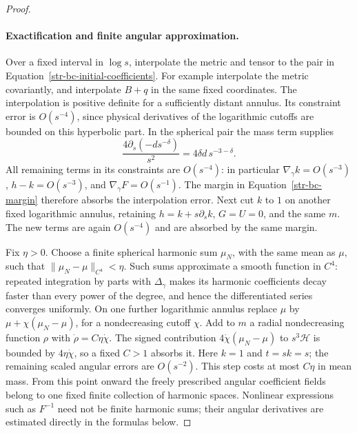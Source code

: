 \begin{proof}
\paragraph{Exactification and finite angular approximation.}
Over a fixed interval in $\log s$, interpolate the metric and tensor to the
pair in Equation~\eqref{str-bc-initial-coefficients}. For example interpolate
the metric covariantly, and interpolate $B+q$ in the same fixed coordinates.
The interpolation is positive definite for a sufficiently distant annulus.
Its constraint error is $O(s^{-4})$, since physical derivatives of the
logarithmic cutoffs are bounded on this hyperbolic part. In the spherical
pair the mass term supplies
\begin{equation}
 \frac{4\partial_s(-ds^{-\delta})}{s^2}
       =4\delta d\,s^{-3-\delta}.
 \label{str-bc-margin}
\end{equation}
All remaining terms in its constraints are $O(s^{-4})$: in particular
$\nabla_\gamma k=O(s^{-3})$, $h-k=O(s^{-3})$,
and $\nabla_\gamma F=O(s^{-1})$. The margin in
Equation~\eqref{str-bc-margin} therefore absorbs the interpolation error.
Next cut $k$ to $1$ on another fixed logarithmic annulus, retaining
$h=k+s\partial_sk$, $G=U=0$, and the same $m$. The new terms are again
$O(s^{-4})$ and are absorbed by the same margin.

Fix $\eta>0$. Choose a finite spherical harmonic sum $\mu_N$, with the same
mean as $\mu$, such that $\|\mu_N-\mu\|_{C^4}<\eta$. Such sums approximate
a smooth function in $C^4$: repeated integration by parts with $\Delta_\gamma$
makes its harmonic coefficients decay faster than every power of the degree,
and hence the differentiated series converges uniformly. On one further
logarithmic annulus replace $\mu$ by
$\mu+\chi(\mu_N-\mu)$, for a nondecreasing cutoff $\chi$. Add to $m$ a
radial nondecreasing function $\rho$ with
$\dot\rho=C\eta\dot\chi$. The signed contribution
$4\dot\chi(\mu_N-\mu)$ to $s^3\mathcal H$ is bounded by
$4\eta\dot\chi$, so a fixed $C>1$ absorbs it. Here $k=1$ and $t=sk=s$;
the remaining scaled angular errors are $O(s^{-2})$. This step costs at
most $C\eta$ in mean mass. From this point onward the freely prescribed
angular coefficient fields belong to one fixed finite collection of
harmonic spaces. Nonlinear expressions such as $F^{-1}$ need not be
finite harmonic sums; their angular derivatives are estimated directly
in the formulas below.


\end{proof}

